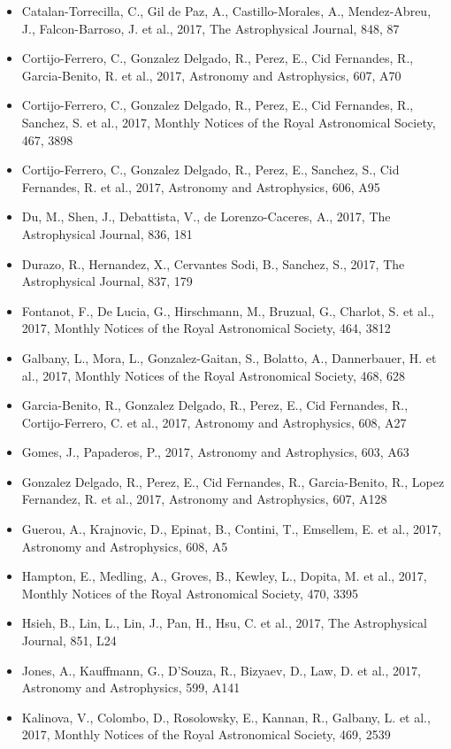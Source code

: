 \documentclass{letter}
\begin{document}
\begin{enumerate}
\begin{itemize}
\item Catalan-Torrecilla, C., Gil de Paz, A., Castillo-Morales, A., Mendez-Abreu, J., Falcon-Barroso, J. et al., 2017, The Astrophysical Journal, 848, 87
\item Cortijo-Ferrero, C., Gonzalez Delgado, R., Perez, E., Cid Fernandes, R., Garcia-Benito, R. et al., 2017, Astronomy and Astrophysics, 607, A70
\item Cortijo-Ferrero, C., Gonzalez Delgado, R., Perez, E., Cid Fernandes, R., Sanchez, S. et al., 2017, Monthly Notices of the Royal Astronomical Society, 467, 3898
\item Cortijo-Ferrero, C., Gonzalez Delgado, R., Perez, E., Sanchez, S., Cid Fernandes, R. et al., 2017, Astronomy and Astrophysics, 606, A95
\item Du, M., Shen, J., Debattista, V., de Lorenzo-Caceres, A., 2017, The Astrophysical Journal, 836, 181
\item Durazo, R., Hernandez, X., Cervantes Sodi, B., Sanchez, S., 2017, The Astrophysical Journal, 837, 179
\item Fontanot, F., De Lucia, G., Hirschmann, M., Bruzual, G., Charlot, S. et al., 2017, Monthly Notices of the Royal Astronomical Society, 464, 3812
\item Galbany, L., Mora, L., Gonzalez-Gaitan, S., Bolatto, A., Dannerbauer, H. et al., 2017, Monthly Notices of the Royal Astronomical Society, 468, 628
\item Garcia-Benito, R., Gonzalez Delgado, R., Perez, E., Cid Fernandes, R., Cortijo-Ferrero, C. et al., 2017, Astronomy and Astrophysics, 608, A27
\item Gomes, J., Papaderos, P., 2017, Astronomy and Astrophysics, 603, A63
\item Gonzalez Delgado, R., Perez, E., Cid Fernandes, R., Garcia-Benito, R., Lopez Fernandez, R. et al., 2017, Astronomy and Astrophysics, 607, A128
\item Guerou, A., Krajnovic, D., Epinat, B., Contini, T., Emsellem, E. et al., 2017, Astronomy and Astrophysics, 608, A5
\item Hampton, E., Medling, A., Groves, B., Kewley, L., Dopita, M. et al., 2017, Monthly Notices of the Royal Astronomical Society, 470, 3395
\item Hsieh, B., Lin, L., Lin, J., Pan, H., Hsu, C. et al., 2017, The Astrophysical Journal, 851, L24
\item Jones, A., Kauffmann, G., D'Souza, R., Bizyaev, D., Law, D. et al., 2017, Astronomy and Astrophysics, 599, A141
\item Kalinova, V., Colombo, D., Rosolowsky, E., Kannan, R., Galbany, L. et al., 2017, Monthly Notices of the Royal Astronomical Society, 469, 2539

\end{itemize}
\end{enumerate}
\end{document}
